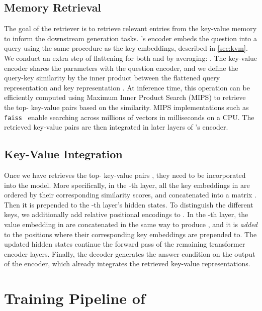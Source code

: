 \subsection{Memory Retrieval} \label{sec:retriever}


The goal of the retriever is to retrieve relevant entries from the key-value memory  to inform the downstream generation tasks.
\ModelName's encoder embeds the question into a query  using the same procedure as the key embeddings, described in \cref{sec:kvm}.
We conduct an extra step of flattening for both  and  by averaging:   
.
The key-value encoder shares the parameters with the question encoder,
and we define the query-key similarity by the inner product between the flattened query representation and key representation .
At inference time, this operation can be efficiently computed using Maximum Inner Product Search (MIPS)
to retrieve the top- key-value pairs  based on the similarity.
MIPS implementations such as \texttt{faiss}~\citep{faiss} enable searching across millions of vectors in milliseconds on a CPU.
The retrieved key-value pairs  are then integrated in later layers of \ModelName's encoder.


\subsection{Key-Value Integration} \label{sec:integration}


Once we have retrieves the top- key-value pairs , they need to be incorporated into the model. 
More specifically, in the -th layer, all the key embeddings in  are ordered by their corresponding similarity scores, and concatenated into a matrix .
Then it is prepended to the -th layer's hidden states.
To distinguish the different keys, we additionally add relative positional encodings to .
In the -th layer, the value embedding in  are concatenated in the same way to produce , and it is \emph{added} to the positions where their corresponding key embeddings are prepended to.
The updated hidden states continue the forward pass of the remaining transformer encoder layers.
Finally, the decoder generates the answer condition on the output of the encoder, which already integrates the retrieved key-value representations.



\section{Training Pipeline of \ModelName} \label{sec:pipeline}

